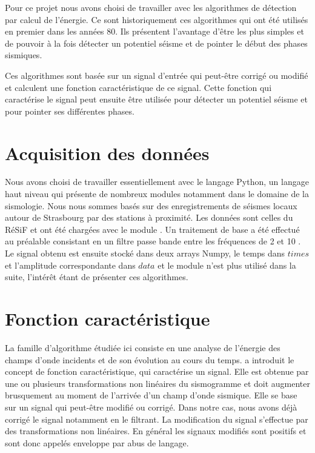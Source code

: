 \documentclass[a4paper, 11pt]{article} %
\begin{document}
Pour ce projet nous avons choisi de travailler avec les algorithmes de détection par calcul de l’énergie. Ce sont historiquement ces algorithmes qui ont été utilisés en premier dans les années 80. Ils présentent l'avantage d'être les plus simples et de pouvoir à la fois détecter un potentiel séisme et de pointer le début des phases sismiques. 

Ces algorithmes sont basée sur un signal d'entrée qui peut-être corrigé ou modifié et calculent une fonction caractéristique de ce signal. Cette fonction qui caractérise le signal peut ensuite être utilisée pour détecter un potentiel séisme et pour pointer ses différentes phases.

\section{Acquisition des données}

Nous avons choisi de travailler essentiellement avec le langage Python, un langage haut niveau qui présente de nombreux modules notamment dans le domaine de la sismologie. Nous nous sommes basés sur des enregistrements de séismes locaux autour de Strasbourg par des stations à proximité. Les données sont celles du RéSiF et ont été chargées avec le module \cite{obspy}. Un traitement de base a été effectué au préalable consistant en un filtre passe bande entre les fréquences de 2 \hertz  et 10 \hertz. Le signal obtenu est ensuite stocké dans deux arrays Numpy, le temps dans $times$ et l'amplitude correspondante dans $data$ et le module \cite{obspy} n'est plus utilisé dans la suite, l'intérêt étant de présenter ces algorithmes.

\section{Fonction caractéristique}

La famille d'algorithme étudiée ici consiste en une analyse de l'énergie des champs d'onde incidents et de son évolution au cours du temps. \cite{allen1978} a introduit le concept de fonction caractéristique, qui caractérise un signal. Elle est obtenue par une ou plusieurs transformations non linéaires du sismogramme et doit augmenter brusquement au moment de l'arrivée d'un champ d'onde sismique. Elle se base sur un signal qui peut-être modifié ou corrigé. Dans notre cas, nous avons déjà corrigé le signal notamment en le filtrant. La modification du signal s'effectue par des transformations non linéaires. En général les signaux modifiés sont positifs et sont donc appelés enveloppe par abus de langage. 
\end{document}

